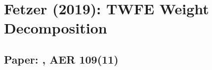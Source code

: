 \documentclass[12pt]{article}
\begin{document}
\section*{Fetzer (2019): TWFE Weight Decomposition}
\subsection*{Paper: , AER 109(11)}




\end{document}
